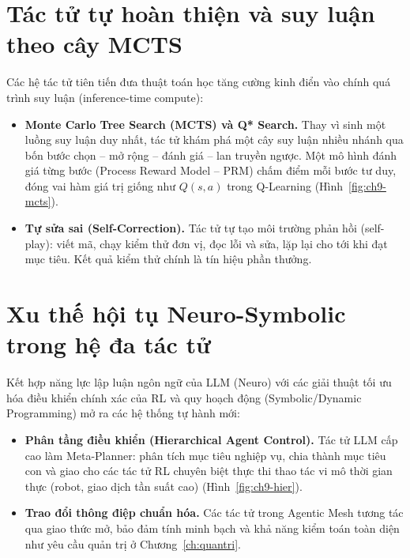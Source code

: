 \section{Tác tử tự hoàn thiện và suy luận theo cây MCTS}
Các hệ tác tử tiên tiến đưa thuật toán học tăng cường kinh điển vào chính quá trình suy luận (inference-time compute):
\begin{itemize}
  \item \textbf{Monte Carlo Tree Search (MCTS) và Q* Search.} Thay vì sinh một luồng suy luận duy nhất, tác tử khám phá
        một cây suy luận nhiều nhánh qua bốn bước chọn -- mở rộng -- đánh giá -- lan truyền ngược. Một mô hình đánh giá
        từng bước (Process Reward Model -- PRM) chấm điểm mỗi bước tư duy, đóng vai hàm giá trị giống như $Q(s,a)$
        trong Q-Learning (Hình~\ref{fig:ch9-mcts}).
  \item \textbf{Tự sửa sai (Self-Correction).} Tác tử tự tạo môi trường phản hồi (self-play): viết mã, chạy kiểm thử đơn vị,
        đọc lỗi và sửa, lặp lại cho tới khi đạt mục tiêu. Kết quả kiểm thử chính là tín hiệu phần thưởng.
\end{itemize}


\section{Xu thế hội tụ Neuro-Symbolic trong hệ đa tác tử}
Kết hợp năng lực lập luận ngôn ngữ của LLM (Neuro) với các giải thuật tối ưu hóa điều khiển chính xác của RL và quy hoạch
động (Symbolic/Dynamic Programming) mở ra các hệ thống tự hành mới:
\begin{itemize}
  \item \textbf{Phân tầng điều khiển (Hierarchical Agent Control).} Tác tử LLM cấp cao làm Meta-Planner: phân tích mục tiêu
        nghiệp vụ, chia thành mục tiêu con và giao cho các tác tử RL chuyên biệt thực thi thao tác vi mô thời gian thực
        (robot, giao dịch tần suất cao) (Hình~\ref{fig:ch9-hier}).
  \item \textbf{Trao đổi thông điệp chuẩn hóa.} Các tác tử trong Agentic Mesh tương tác qua giao thức mở, bảo đảm tính
        minh bạch và khả năng kiểm toán toàn diện như yêu cầu quản trị ở Chương~\ref{ch:quantri}.
\end{itemize}

